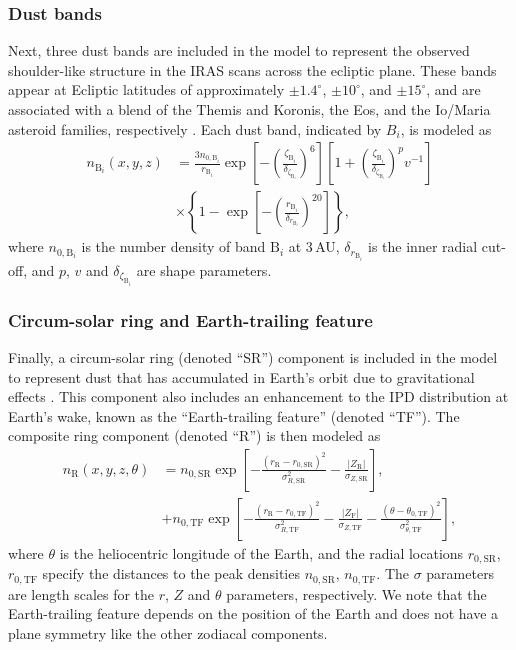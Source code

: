 \documentclass[twocolumn]{aa}
\begin{document}
\subsubsection{Dust bands}
Next, three dust bands are included in the model to represent the
observed shoulder-like structure in the IRAS scans across the ecliptic
plane.  These bands appear at Ecliptic latitudes of approximately
$\pm1.4^\circ$, $\pm10^\circ$, and $\pm15^\circ$, and are associated with
a blend of the Themis and Koronis, the Eos, and the Io/Maria asteroid families, 
respectively \citep{Reach1997}. Each dust band, indicated by $B_i$, is 
modeled as
\begin{align}
    n_{\mathrm{B}_i}(x,y,z) &= \frac{3 n_{0, \mathrm{B}_i}}{r_{\mathrm{B}_i}} \exp \left[-\left(\frac{\zeta_{\mathrm{B}_i}}{\delta_{\zeta_{\mathrm{B}_i}}}\right)^{6}\right]\left[1 + \left(\frac{\zeta_{\mathrm{B}_i}}{\delta_{\zeta_{\mathrm{B}_i}}}\right)^{p}v^{-1}\right] \\
    &\times\left\{1-\exp \left[-\left(\frac{r_{\mathrm{B}_i}}{\delta_{r_{\mathrm{B}_i}}}\right)^{20}\right]\right\},
\label{eq:band}
\end{align}
where $n_{0, \mathrm{B}_i}$ is the number density of band $\mathrm{B}_i$ 
at 3\,AU, $\delta_{r_{\mathrm{B}_i}}$ is the inner radial cut-off, and 
$p$, $v$ and $\delta_{\zeta_{\mathrm{B}_i}}$ are shape parameters.

\subsubsection{Circum-solar ring and Earth-trailing feature}
\label{sec:ring}
Finally, a circum-solar ring (denoted ``SR'') component is included in the
model to represent dust that has accumulated in Earth's orbit due to
gravitational effects \citep{Dermott1994}. This component also
includes an enhancement to the IPD distribution at Earth's wake, known
as the ``Earth-trailing feature'' (denoted ``TF''). The composite ring component (denoted ``R'') is then modeled as
\begin{align}
    n_\mathrm{R}(x, y, z, \theta)&=n_{0, \mathrm{SR}} \exp \left[-\frac{\left(r_\mathrm{R}-r_{0, \mathrm{SR}}\right)^2}{\sigma_{R,\mathrm{SR}} ^2}-\frac{\left| Z_\mathrm{R} \right|}{\sigma_{Z, \mathrm{SR}}}\right],\\
   &+ n_{0, \mathrm{TF}} \exp \left[-\frac{\left(r_\mathrm{R}-r_{0,
          \mathrm{TF}}\right)^{2}}{\sigma_{R,
          \mathrm{TF}}^{2}}-\frac{\left|Z_\mathrm{F}\right|}{\sigma_{Z,
          \mathrm{TF}}}-\frac{\left(\theta-\theta_{0,
          \mathrm{TF}}\right)^{2}}{\sigma_{\theta,\mathrm{TF}}^{2}}\right],
    \label{eq:ring}
\end{align}
where $\theta$ is the heliocentric longitude of the Earth, and the 
radial locations $r_{0, \mathrm{SR}}$, $r_{0, \mathrm{TF}}$ specify
the distances to the peak densities $n_{0, \mathrm{SR}}$, 
$n_{0, \mathrm{TF}}$. The $\sigma$ parameters are length scales for the 
$r$, $Z$ and $\theta$ parameters, respectively. We note that the 
Earth-trailing feature depends on the position of the Earth and does not 
have a plane symmetry like the other zodiacal components. 
\end{document}
